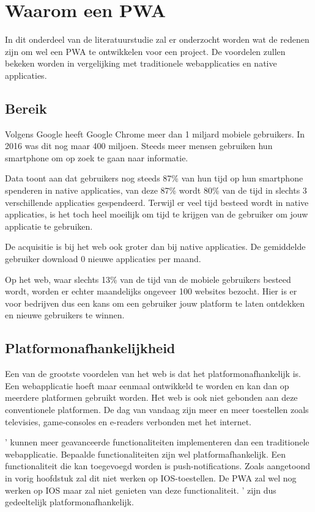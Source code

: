 \section{Waarom een PWA}

In dit onderdeel van de literatuurstudie zal er onderzocht worden wat de redenen zijn om wel een PWA te ontwikkelen voor een project. De voordelen zullen bekeken worden in vergelijking met traditionele webapplicaties en native applicaties.
\autocite{TandelSunil2018}


\subsection{Bereik}
	Volgens Google heeft Google Chrome meer dan 1 miljard mobiele gebruikers. In 2016 was dit nog maar 400 miljoen. Steeds meer mensen gebruiken hun smartphone om op zoek te gaan naar informatie. 
	
	\autocite{Nath2017}
	
	Data toont aan dat gebruikers nog steeds 87\% van hun tijd op hun smartphone spenderen in native applicaties, van deze 87\% wordt 80\% van de tijd in slechts 3 verschillende applicaties gespendeerd. Terwijl er veel tijd besteed wordt in native applicaties, is het toch heel moeilijk om tijd te krijgen van de gebruiker om jouw applicatie te gebruiken.
	
	De acquisitie is bij het web ook groter dan bij native applicaties. De gemiddelde gebruiker download 0 nieuwe applicaties per maand. 
	
	Op het web, waar slechts 13\% van de tijd van de mobiele gebruikers besteed wordt, worden er echter maandelijks ongeveer 100 websites bezocht. Hier is er voor bedrijven dus een kans om een gebruiker jouw platform te laten ontdekken en nieuwe gebruikers te winnen.
	
	\autocite{GoogleChromeDevelopers2017}
	

\subsection{Platformonafhankelijkheid }
	Een van de grootste voordelen van het web is dat het platformonafhankelijk is. Een webapplicatie hoeft maar eenmaal ontwikkeld te worden en kan dan op meerdere platformen gebruikt worden. Het web is ook niet gebonden aan deze conventionele platformen. De dag van vandaag zijn meer en meer toestellen zoals televisies, game-consoles en e-readers verbonden met het internet. 
	
	' kunnen meer geavanceerde functionaliteiten implementeren dan een traditionele webapplicatie. Bepaalde functionaliteiten zijn wel platformafhankelijk. Een functionaliteit die kan toegevoegd worden is push-notifications. Zoals aangetoond in vorig hoofdstuk zal dit niet werken op IOS-toestellen. De PWA zal wel nog werken op IOS maar zal niet genieten van deze functionaliteit. ' zijn dus gedeeltelijk platformonafhankelijk.
	
